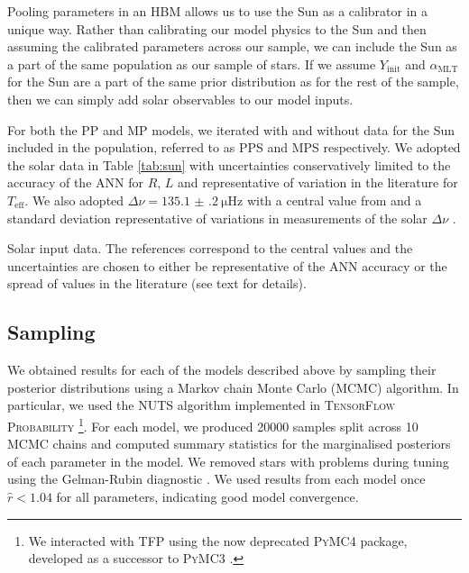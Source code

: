 \documentclass[a4paper,fleqn,usenatbib]{mnras}
\newcommand{\dnu}{\ensuremath{\Delta\nu}}
\newcommand{\teff}{\ensuremath{T_\mathrm{eff}}}
\newcommand{\mlt}{\ensuremath{{\alpha_\mathrm{MLT}}}}
\begin{document}

Pooling parameters in an HBM allows us to use the Sun as a calibrator in a unique way. Rather than calibrating our model physics to the Sun and then assuming the calibrated parameters across our sample, we can include the Sun as a part of the same population as our sample of stars. If we assume $Y_\mathrm{init}$ and $\mlt$ for the Sun are a part of the same prior distribution as for the rest of the sample, then we can simply add solar observables to our model inputs.

For both the PP and MP models, we iterated with and without data for the Sun included in the population, referred to as PPS and MPS respectively. We adopted the solar data in Table \ref{tab:sun} with uncertainties conservatively limited to the accuracy of the ANN for $R$, $L$ and representative of variation in the literature for $\teff$. We also adopted $\dnu=\SI{135.1(2)}{\micro\hertz}$ with a central value from \citet{Huber.Bedding.ea2011} and a standard deviation representative of variations in measurements of the solar $\dnu$ \citep{Broomhall.Chaplin.ea2011}.

\begin{table}
    \centering
    \caption{Solar input data. The references correspond to the central values and the uncertainties are chosen to either be representative of the ANN accuracy or the spread of values in the literature (see text for details).}
    \label{tab:sun}
    
\end{table}

\subsection{Sampling}

We obtained results for each of the models described above by sampling their posterior distributions using a Markov chain Monte Carlo (MCMC) algorithm. In particular, we used the NUTS algorithm implemented in \textsc{TensorFlow Probability} \citep[\textsc{TFP};][]{Abadi.Barham.ea2016, Dillon.Langmore.ea2017}\footnote{We interacted with \textsc{TFP} using the now deprecated \textsc{PyMC4} package, developed as a successor to \textsc{PyMC3} \citep{Salvatier.Wiecki.ea2016}.}. For each model, we produced \num{20000} samples split across \num{10} MCMC chains and computed summary statistics for the marginalised posteriors of each parameter in the model. We removed stars with problems during tuning using the Gelman-Rubin diagnostic \citep[$\hat{r}$;][]{Gelman.Rubin1992}. We used results from each model once $\hat{r} < 1.04$ for all parameters, indicating good model convergence.
\end{document}
